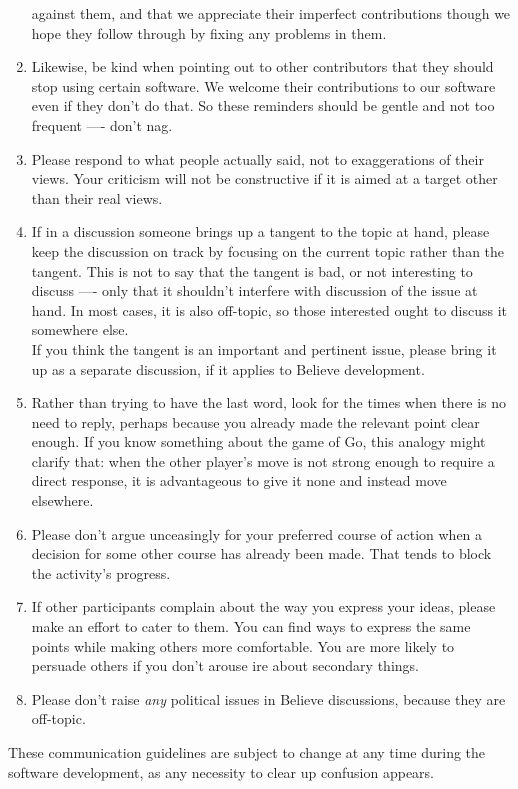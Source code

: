 \documentclass[openright,a4paper,twoside,12pt]{memoir}
\begin{document}
\begin{enumerate}
against them, and that we appreciate their imperfect contributions
though we hope they follow through by fixing any problems in them.
\item Likewise, be kind when pointing out to other contributors that they
should stop using certain software. We welcome their contributions
to our software even if they don't do that. So these reminders
should be gentle and not too frequent —- don't nag.
\item Please respond to what people actually said, not to exaggerations of
their views. Your criticism will not be constructive if it is aimed
at a target other than their real views.
\item If in a discussion someone brings up a tangent to the topic at hand,
please keep the discussion on track by focusing on the current topic
rather than the tangent. This is not to say that the tangent is bad,
or not interesting to discuss —- only that it shouldn't interfere
with discussion of the issue at hand. In most cases, it is also
off-topic, so those interested ought to discuss it somewhere else.\\
If you think the tangent is an important and pertinent issue, please
bring it up as a separate discussion, if it applies to Believe
development.
\item Rather than trying to have the last word, look for the times when
there is no need to reply, perhaps because you already made the
relevant point clear enough. If you know something about the game of
Go, this analogy might clarify that: when the other player's move is
not strong enough to require a direct response, it is advantageous
to give it none and instead move elsewhere.
\item Please don't argue unceasingly for your preferred course of action
when a decision for some other course has already been made. That
tends to block the activity's progress.
\item If other participants complain about the way you express your ideas,
please make an effort to cater to them. You can find ways to express
the same points while making others more comfortable. You are more
likely to persuade others if you don't arouse ire about secondary
things.
\item Please don't raise \emph{any} political issues in Believe discussions,
because they are off-topic.
\end{enumerate}

These communication guidelines are subject to change at any time
during the software development, as any necessity to clear up
confusion appears.
\end{document}
